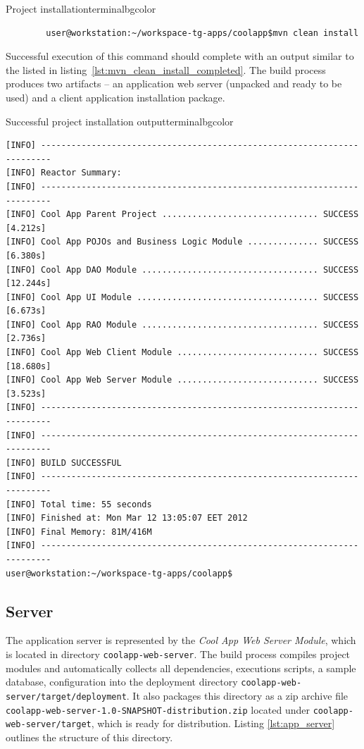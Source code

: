   \begin{code}{Project installation}{\label{lst:mvn_clean_install}}{terminalbgcolor}
     \begin{lstlisting}
        user@workstation:~/workspace-tg-apps/coolapp$mvn clean install
     \end{lstlisting}
  \end{code}

  Successful execution of this command should complete with an output similar to the listed in listing~\ref{lst:mvn_clean_install_completed}.
  The build process produces two artifacts -- an application web server (unpacked and ready to be used) and a client application installation package.
  
  \begin{code}{Successful project installation output}{\label{lst:mvn_clean_install_completed}}{terminalbgcolor}
      \begin{lstlisting}
[INFO] ------------------------------------------------------------------------
[INFO] Reactor Summary:
[INFO] ------------------------------------------------------------------------
[INFO] Cool App Parent Project ............................... SUCCESS [4.212s]
[INFO] Cool App POJOs and Business Logic Module .............. SUCCESS [6.380s]
[INFO] Cool App DAO Module ................................... SUCCESS [12.244s]
[INFO] Cool App UI Module .................................... SUCCESS [6.673s]
[INFO] Cool App RAO Module ................................... SUCCESS [2.736s]
[INFO] Cool App Web Client Module ............................ SUCCESS [18.680s]
[INFO] Cool App Web Server Module ............................ SUCCESS [3.523s]
[INFO] ------------------------------------------------------------------------
[INFO] ------------------------------------------------------------------------
[INFO] BUILD SUCCESSFUL
[INFO] ------------------------------------------------------------------------
[INFO] Total time: 55 seconds
[INFO] Finished at: Mon Mar 12 13:05:07 EET 2012
[INFO] Final Memory: 81M/416M
[INFO] ------------------------------------------------------------------------
user@workstation:~/workspace-tg-apps/coolapp$ 
      \end{lstlisting}
  \end{code}

\subsection{Server}

  The application server is represented by the \emph{Cool App Web Server Module}, which is located in directory \texttt{coolapp-web-server}.
  The build process compiles project modules and automatically collects all dependencies, executions scripts, a sample database, configuration into the deployment directory \texttt{coolapp-web-server/target/deployment}.
  It also packages this directory as a zip archive file \texttt{coolapp-web-server-1.0-SNAPSHOT-distribution.zip} located under \texttt{coolapp-web-server/target}, which is ready for distribution.
  Listing \ref{lst:app_server} outlines the structure of this directory.

